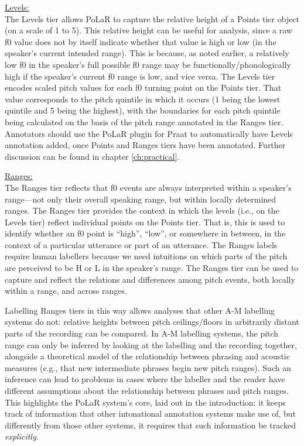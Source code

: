 \uline{Levels:}\\ The Levels tier allows PoLaR to capture the relative height of a Points tier object (on a scale of 1 to 5). This relative height can be useful for analysis, since a raw f0 value does not by itself indicate whether that value is high or low (in the speaker’s current intended range). This is because, as noted earlier, a relatively low f0 in the speaker’s full possible f0 range may be functionally\slash phonologically high if the speaker’s current f0 range is low, and vice versa. The Levels tier encodes scaled pitch values for each f0 turning point on the Points tier. That value corresponds to the pitch quintile in which it occurs (1 being the lowest quintile and 5 being the highest), with the boundaries for each pitch quintile being calculated on the basis of the pitch range annotated in the Ranges tier. Annotators should use the PoLaR plugin for Praat to automatically have Levels annotation added, once Points and Ranges tiers have been annotated. Further discussion can be found in chapter \ref{ch:practical}.

\uline{Ranges:}\\ The Ranges tier reflects that f0 events are always interpreted within a speaker’s range—not only their overall speaking range, but within locally determined ranges. The Ranges tier provides the context in which the levels (i.e., on the Levels tier) reflect individual points on the Points tier. That is, this is used to identify whether an f0 point is “high”, “low”, or somewhere in between, in the context of a particular utterance or part of an utterance. The Ranges labels require human labellers because we need intuitions on which parts of the pitch are perceived to be H or L in the speaker’s range. The Ranges tier can be used to capture and reflect the relations and differences among pitch events, both locally within a range, and across ranges.

Labelling Ranges tiers in this way allows analyses that other A-M labelling systems do not: relative heights between pitch ceilings\slash floors in arbitrarily distant parts of the recording can be compared. In A-M labelling systems, the pitch range can only be inferred by looking at the labelling and the recording together, alongside a theoretical model of the relationship between phrasing and acoustic measures (e.g., that new intermediate phrases begin new pitch ranges). Such an inference can lead to problems in cases where the labeller and the reader have different assumptions about the relationship between phrases and pitch ranges. This highlights the PoLaR system’s core, laid out in the introduction: it keeps track of information that other intonational annotation systems make use of, but differently from those other systems, it requires that such information be tracked \emph{explicitly}.

